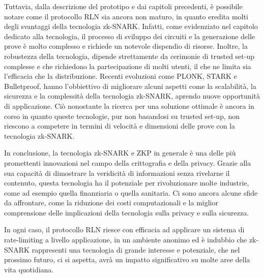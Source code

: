 Tuttavia, dalla descrizione del prototipo e dai capitoli precedenti, è possibile notare come il protocollo RLN sia
ancora non maturo, in quanto eredita molti degli svantaggi della tecnologia zk-SNARK. Infatti, come evidenziato nel
capitolo dedicato alla tecnologia, il processo di sviluppo dei circuiti e la generazione delle prove è molto complesso e
richiede un notevole dispendio di risorse. Inoltre, la robustezza della tecnologia, dipende strettamente da cerimonie
di trusted set-up complesse e che richiedono la partecipazione di molti utenti, il che ne limita sia l'efficacia che la
distribuzione. Recenti evoluzioni come PLONK, STARK e Bulletproof, hanno l'obbiettivo di migliorare alcuni aspetti come la scalabilità,
la sicurezza e la complessità della tecnologia zk-SNARK, aprendo nuove opportunità di applicazione. Ciò nonostante la ricerca per una
soluzione ottimale è ancora in corso in quanto queste tecnologie, pur non basandosi su trusted set-up, non riescono a
competere in termini di velocità e dimensioni delle prove con la tecnologia zk-SNARK.

In conclusione, la tecnologia zk-SNARK e ZKP in generale è una delle più promettenti innovazioni nel campo della
crittografia e della privacy. Grazie alla sua capacità di dimostrare la veridicità di informazioni senza rivelarne il
contenuto, questa tecnologia ha il potenziale per rivoluzionare molte industrie, come ad esempio quella finanziaria o
quella sanitaria. Ci sono ancora alcune sfide da affrontare, come la riduzione dei costi computazionali e la miglior
comprensione delle implicazioni della tecnologia sulla privacy e sulla sicurezza.

In ogni caso, il protocollo RLN riesce con efficacia ad applicare un sistema di rate-limiting a livello applicazione, in
un ambiente anonimo ed è indubbio che zk-SNARK rappresenti una tecnologia di grande interesse e potenziale, che nel
prossimo futuro, ci si aspetta, avrà un impatto significativo su molte aree della vita quotidiana.